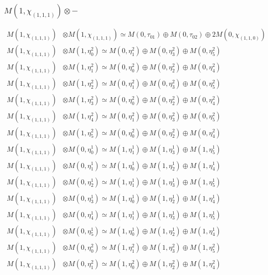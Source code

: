 \subsubsection{$ M(1,\chi_{(1,1,1)})\otimes -$}
\begin{align*}
M(1,\chi_{(1,1,1)}) &\otimes M(1,\chi_{(1,1,1)}) \simeq M(0,\tau_{01}) \oplus M(0,\tau_{02}) \oplus 2 M(0,\chi_{(1,1,0)}) \\
M(1,\chi_{(1,1,1)}) &\otimes M(1,\eta^{2}_{0}) \simeq M(0,\eta^{2}_{1}) \oplus M(0,\eta^{2}_{3}) \oplus M(0,\eta^{2}_{5}) \\
M(1,\chi_{(1,1,1)}) &\otimes M(1,\eta^{2}_{1}) \simeq M(0,\eta^{2}_{0}) \oplus M(0,\eta^{2}_{2}) \oplus M(0,\eta^{2}_{4}) \\
M(1,\chi_{(1,1,1)}) &\otimes M(1,\eta^{2}_{2}) \simeq M(0,\eta^{2}_{1}) \oplus M(0,\eta^{2}_{3}) \oplus M(0,\eta^{2}_{5}) \\
M(1,\chi_{(1,1,1)}) &\otimes M(1,\eta^{2}_{3}) \simeq M(0,\eta^{2}_{0}) \oplus M(0,\eta^{2}_{2}) \oplus M(0,\eta^{2}_{4}) \\
M(1,\chi_{(1,1,1)}) &\otimes M(1,\eta^{2}_{4}) \simeq M(0,\eta^{2}_{1}) \oplus M(0,\eta^{2}_{3}) \oplus M(0,\eta^{2}_{5}) \\
M(1,\chi_{(1,1,1)}) &\otimes M(1,\eta^{2}_{5}) \simeq M(0,\eta^{2}_{0}) \oplus M(0,\eta^{2}_{2}) \oplus M(0,\eta^{2}_{4}) \\
M(1,\chi_{(1,1,1)}) &\otimes M(0,\eta^{1}_{0}) \simeq M(1,\eta^{1}_{1}) \oplus M(1,\eta^{1}_{3}) \oplus M(1,\eta^{1}_{5}) \\
M(1,\chi_{(1,1,1)}) &\otimes M(0,\eta^{1}_{1}) \simeq M(1,\eta^{1}_{0}) \oplus M(1,\eta^{1}_{2}) \oplus M(1,\eta^{1}_{4}) \\
M(1,\chi_{(1,1,1)}) &\otimes M(0,\eta^{1}_{2}) \simeq M(1,\eta^{1}_{1}) \oplus M(1,\eta^{1}_{3}) \oplus M(1,\eta^{1}_{5}) \\
M(1,\chi_{(1,1,1)}) &\otimes M(0,\eta^{1}_{3}) \simeq M(1,\eta^{1}_{0}) \oplus M(1,\eta^{1}_{2}) \oplus M(1,\eta^{1}_{4}) \\
M(1,\chi_{(1,1,1)}) &\otimes M(0,\eta^{1}_{4}) \simeq M(1,\eta^{1}_{1}) \oplus M(1,\eta^{1}_{3}) \oplus M(1,\eta^{1}_{5}) \\
M(1,\chi_{(1,1,1)}) &\otimes M(0,\eta^{1}_{5}) \simeq M(1,\eta^{1}_{0}) \oplus M(1,\eta^{1}_{2}) \oplus M(1,\eta^{1}_{4}) \\
M(1,\chi_{(1,1,1)}) &\otimes M(0,\eta^{2}_{0}) \simeq M(1,\eta^{2}_{1}) \oplus M(1,\eta^{2}_{3}) \oplus M(1,\eta^{2}_{5}) \\
M(1,\chi_{(1,1,1)}) &\otimes M(0,\eta^{2}_{1}) \simeq M(1,\eta^{2}_{0}) \oplus M(1,\eta^{2}_{2}) \oplus M(1,\eta^{2}_{4}) \\

\end{align*}

